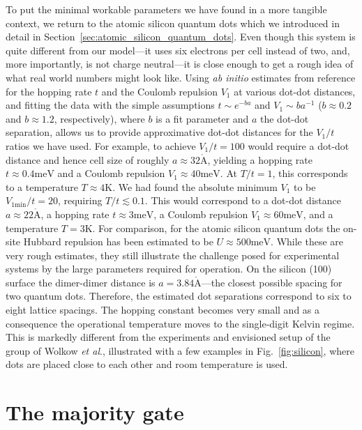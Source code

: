 To put the minimal workable parameters we have found in a more tangible context,
we return to the atomic silicon quantum dots which we introduced in detail in
Section~\ref{sec:atomic_silicon_quantum_dots}. Even though this system is quite
different from our model---it uses six electrons per cell instead of two, and,
more importantly, is not charge neutral---it is close enough to get a rough idea
of what real world numbers might look like. Using \emph{ab initio} estimates
from reference \cite{pitters2011tunnel} for the hopping rate $t$ and the Coulomb
repulsion $V_1$ at various dot-dot distances, and fitting the data with the
simple assumptions $t \sim e^{-b a}$ and $V_1 \sim b a^{-1}$ ($b \approx 0.2$
and $b \approx 1.2$, respectively), where $b$ is a fit parameter and $a$ the
dot-dot separation, allows us to provide approximative dot-dot distances for the
$V_1/t$ ratios we have used. For example, to achieve $V_1/t = 100$ would require
a dot-dot distance and hence cell size of roughly $a \approx 32
\mathring{\mathrm{A}}$, yielding a hopping rate $t \approx 0.4 \text{meV}$ and a
Coulomb repulsion $V_1 \approx 40 \text{meV}$. At $T/t = 1$, this corresponds to
a temperature $T \approx 4 \text{K}$. We had found the absolute minimum $V_1$ to
be $V_{1\text{min}}/t = 20$, requiring $T/t \lesssim 0.1$. This would correspond
to a dot-dot distance $a \approx 22 \mathring{\mathrm{A}}$, a hopping rate $t
\approx 3 \text{meV}$, a Coulomb repulsion $V_1 \approx 60 \text{meV}$, and a
temperature $T = 3 \text{K}$. For comparison, for the atomic silicon quantum
dots the on-site Hubbard repulsion has been estimated to be $U \approx 500
\text{meV}$. While these are very rough
estimates, they still illustrate the challenge posed for experimental systems by
the large parameters required for  operation. On the silicon (100)
surface the dimer-dimer distance is $a = 3.84 \mathring{\mathrm{A}}$---the
closest possible spacing for two quantum dots. Therefore, the estimated dot
separations correspond to six to eight lattice spacings. The hopping constant
becomes very small and as a consequence the operational temperature moves to the
single-digit Kelvin regime. This is markedly different from the experiments and
envisioned setup of the group of Wolkow \emph{et al}., illustrated with a few
examples in Fig.~\ref{fig:silicon}, where dots are placed close to each other
and room temperature is used.


\section{The majority gate}

